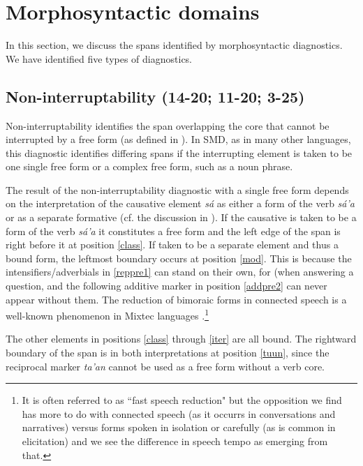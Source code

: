 \documentclass[output=paper]{langscibook}
\begin{document}
\section{Morphosyntactic domains} %
\label{sec:morphosyntacticdomains}
In this section, we discuss the spans identified by morphosyntactic diagnostics. We have identified five types of diagnostics. 

\subsection{Non-interruptability (14-20; 11-20; 3-25)} %
\label{sub:non-interruptability}

Non-interruptability identifies the span overlapping the core that cannot be interrupted by a free form (as defined in ). In SMD, as in many other languages, this diagnostic identifies differing spans if the interrupting element is taken to be one single free form or a complex free form, such as a noun phrase.


The result of the non-interruptability diagnostic with a single free form depends on the interpretation of the causative element \emph{sá} as either a form of the verb \emph{sá'a} or as a separate formative (cf. the discussion in ).
If the causative is taken to be a form of the verb \emph{sá'a} it constitutes a free form and the left edge of the span is right before it at position \ref{class}.
If taken to be a separate element and thus a bound form, the leftmost boundary occurs at position \ref{mod}. This is because the intensifiers/adverbials in \ref{reppre1} can stand on their own, for (when answering a question, and the following additive marker in position \ref{addpre2} can never appear without them.
The reduction of bimoraic forms in connected speech is a well-known phenomenon in Mixtec languages \citep{pike1945problem, macaulay1987cliticization, uchihara2021minimality}.\footnote{It is often referred to as ``fast speech reduction" but the opposition we find has more to do with connected speech (as it occurrs in conversations and narratives) versus forms spoken in isolation or carefully (as is common in elicitation) and we see the difference in speech tempo as emerging from that.}

The other elements in positions \ref{class} through \ref{iter} are all bound. 
The rightward boundary of the span is in both interpretations at position \ref{tuun}, since the reciprocal marker \textit{ta'an} cannot be used as a free form without a verb core. 
\end{document}
